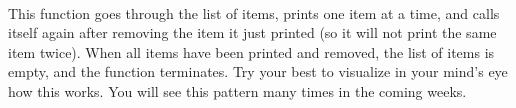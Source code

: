 \documentclass{article}
\begin{document}
\paragraph{}This function goes through the list of items, prints one item at a time, and calls itself again after removing the item it just printed (so it will not print the same item twice). When all items have been printed and removed, the list of items is empty, and the function terminates. Try your best to visualize in your mind's eye how this works. You will see this pattern many times in the coming weeks.
\end{document}
